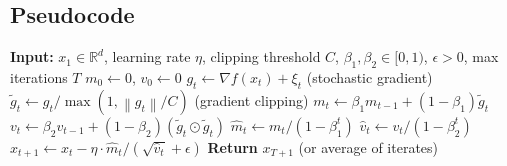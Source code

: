 \documentclass{article}
\newcommand{\R}{\mathbb{R}}
\newcommand{\norm}[1]{\left\| #1 \right\|}
\begin{document}
\subsection*{Pseudocode}
\begin{algorithm}[H]
\caption{Clipped Adam}
\begin{algorithmic}
\STATE \textbf{Input:} $x_1 \in \R^d$, learning rate $\eta$, clipping threshold $C$, $\beta_1, \beta_2 \in [0,1)$, $\epsilon > 0$, max iterations $T$
\STATE $m_0 \gets 0$, $v_0 \gets 0$
    \STATE $g_t \gets \nabla f(x_t) + \xi_t$ \quad (stochastic gradient)
    \STATE $\tilde{g}_t \gets g_t / \max(1, \norm{g_t}/C)$ \quad (gradient clipping)
    \STATE $m_t \gets \beta_1 m_{t-1} + (1-\beta_1) \tilde{g}_t$
    \STATE $v_t \gets \beta_2 v_{t-1} + (1-\beta_2) (\tilde{g}_t \odot \tilde{g}_t)$
    \STATE $\hat{m}_t \gets m_t / (1-\beta_1^t)$
    \STATE $\hat{v}_t \gets v_t / (1-\beta_2^t)$
    \STATE $x_{t+1} \gets x_t - \eta \cdot \hat{m}_t / (\sqrt{\hat{v}_t} + \epsilon)$
\ENDFOR
\STATE \textbf{Return} $x_{T+1}$ (or average of iterates)
\end{algorithmic}
\end{algorithm}
\end{document}
